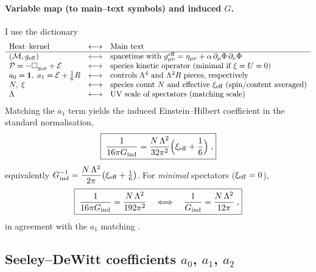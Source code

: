 \documentclass{iopjournal}
\begin{document}
\paragraph{Variable map (to main–text symbols) and induced $G$.}
I use the dictionary
\[
\begin{array}{lll}
\text{Heat–kernel} & \longleftrightarrow & \text{Main text} \\
\hline
(\mathcal{M},g_{\rm eff}) & \longleftrightarrow & \text{spacetime with }g^{\rm eff}_{\mu\nu}=\eta_{\mu\nu}+\alpha\,\partial_\mu\Phi\,\partial_\nu\Phi \\
\mathcal{P}=-\Box_{g_{\rm eff}}+\mathcal{E} & \longleftrightarrow & \text{species kinetic operator (minimal if }\xi=U=0) \\
a_0=\mathbf{1},\; a_1=\mathcal{E}+\tfrac{1}{6}R & \longleftrightarrow & \text{controls }\Lambda^4\text{ and }\Lambda^2 R\text{ pieces, respectively} \\
N,\;\xi & \longleftrightarrow & \text{species count } N \text{ and effective }\xi_{\rm eff}\text{ (spin/content averaged)} \\
\Lambda & \longleftrightarrow & \text{UV scale of spectators (matching scale)} \\
\end{array}
\]
Matching the $a_1$ term yields the induced Einstein–Hilbert coefficient in the standard normalisation,
\begin{equation}
\boxed{\;\frac{1}{16\pi G_{\rm ind}}=\frac{N\,\Lambda^2}{32\pi^2}\Big(\xi_{\rm eff}+\frac{1}{6}\Big)\;,}
\label{eq:induced_general}
\end{equation}
equivalently $G_{\rm ind}^{-1}=\dfrac{N\,\Lambda^2}{2\pi}\big(\xi_{\rm eff}+\tfrac{1}{6}\big)$.
For \emph{minimal} spectators ($\xi_{\rm eff}=0$),
\begin{equation}
\boxed{\;\frac{1}{16\pi G_{\rm ind}}=\frac{N\,\Lambda^2}{192\pi^2}
\quad\Longleftrightarrow\quad
\frac{1}{G_{\rm ind}}=\frac{N\,\Lambda^2}{12\pi}\;,}
\label{eq:induced_minimal}
\end{equation}
in agreement with the $a_1$ matching \cite{DeWitt1965,BirrellDavies,ParkerToms,Vassilevich2003}.

\subsection{\texorpdfstring{Seeley--DeWitt coefficients $a_0$, $a_1$, $a_2$}{Seeley–DeWitt coefficients a0, a1, a2}}\label{app:A2}
 
\end{document}
